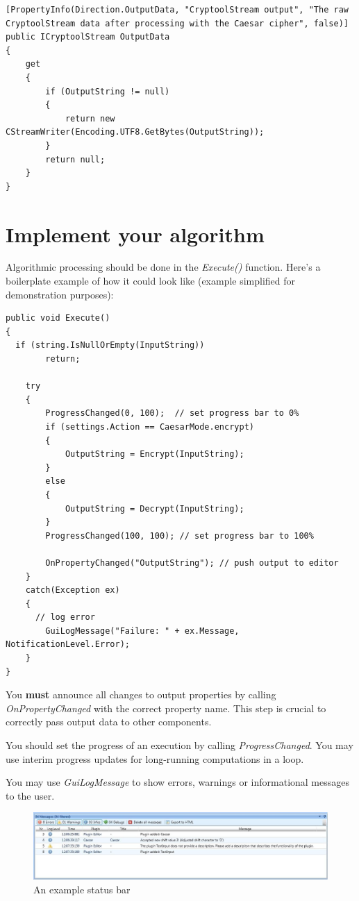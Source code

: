\begin{lstlisting}
[PropertyInfo(Direction.OutputData, "CryptoolStream output", "The raw CryptoolStream data after processing with the Caesar cipher", false)]
public ICryptoolStream OutputData
{
	get
	{
		if (OutputString != null)
		{
			return new CStreamWriter(Encoding.UTF8.GetBytes(OutputString));
		}
		return null;
	}
}
\end{lstlisting}

\section{Implement your algorithm}
\label{sec:ImplementingTheActualAlgorithm}

Algorithmic processing should be done in the \textit{Execute()} function. Here's a boilerplate example of how it could look like (example simplified for demonstration purposes):

\begin{lstlisting}
public void Execute()
{
  if (string.IsNullOrEmpty(InputString))
		return;
	
	try
	{
		ProgressChanged(0, 100);  // set progress bar to 0%
		if (settings.Action == CaesarMode.encrypt)
		{
			OutputString = Encrypt(InputString);
		}
		else
		{
			OutputString = Decrypt(InputString);
		}
		ProgressChanged(100, 100); // set progress bar to 100%
		
		OnPropertyChanged("OutputString"); // push output to editor
	}
	catch(Exception ex)
	{
	  // log error
		GuiLogMessage("Failure: " + ex.Message, NotificationLevel.Error);
	}
}
\end{lstlisting}

You \textbf{must} announce all changes to output properties by calling \textit{OnPropertyChanged} with the correct property name. This step is crucial to correctly pass output data to other components.

You should set the progress of an execution by calling \textit{ProgressChanged}. You may use interim progress updates for long-running computations in a loop.

You may use \textit{GuiLogMessage} to show errors, warnings or informational messages to the user.

\begin{figure}[h]
	\centering
		\includegraphics[width=1.00\textwidth]{figures/status_bar.jpg}
	\caption{An example status bar}
	\label{fig:status_bar}
\end{figure}

